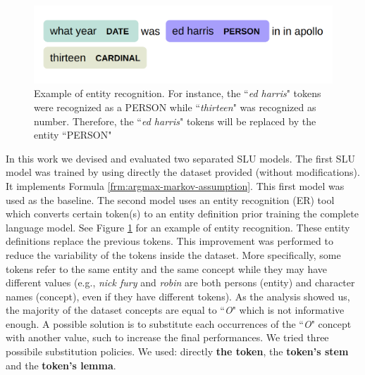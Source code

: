 \documentclass[11pt,a4paper]{article}
\begin{document}
\begin{figure}[b!]
\centering
	\includegraphics[width=1\linewidth]{img/entity}
	\caption{Example of entity recognition. For instance, the ``\textit{ed harris}" tokens were recognized as a PERSON while ``\textit{thirteen}" was recognized as number. Therefore, the ``\textit{ed harris}" tokens will be replaced by the entity ``PERSON"}
	\label{fig:entity-recognition}
\end{figure}

In this work we devised and evaluated two separated SLU models. 
The first SLU model was trained by using directly 
the dataset provided (without modifications). It 
implements Formula \ref{frm:argmax-markov-assumption}. 
This first model was used as the baseline. The second 
model uses an entity recognition (ER) tool which converts 
certain token(s) to an entity definition prior training 
the complete language model. See Figure \ref{fig:entity-recognition} for an example of entity recognition. These 
entity definitions replace the previous tokens. This 
improvement was performed to reduce the variability of 
the tokens inside the dataset. 
More specifically, some tokens refer to the same entity 
and the same concept while they may have different values 
(e.g., \textit{nick fury} and \textit{robin} are both 
persons (entity) and character names (concept), even if 
they have different tokens). 
As the analysis showed us, the majority of the dataset 
concepts  are equal to ``\textit{O}" which is not 
informative enough. A possible solution is to substitute 
each occurrences of the  ``\textit{O}" concept with 
another value, such to increase the final performances.
We tried three possibile substitution policies. We used: 
directly \textbf{the token}, the \textbf{token's stem} and the \textbf{token's lemma}. 
\end{document}
